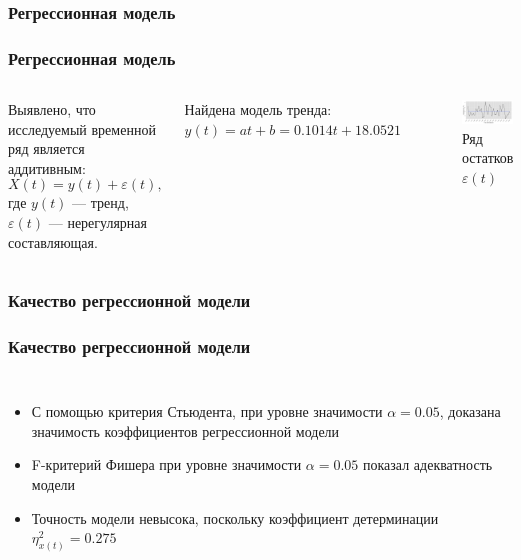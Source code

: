 \documentclass[10pt,pdf,aspectratio=169,hyperref={unicode}]{beamer}
\begin{document}
\subsubsection{Регрессионная модель}
\begin{frame}
  \frametitle{Регрессионная модель}
  \begin{columns}[c]
  \column{2in}
  Выявлено, что исследуемый временной ряд является аддитивным:
  \begin{equation}
    X(t) = y(t) + \varepsilon(t),
  \end{equation}
  где $ y(t) $ --- тренд, $ \varepsilon(t) $ --- нерегулярная составляющая.

  \vspace{0.5em}

  Найдена модель тренда: $ y(t) = at + b = 0.1014t + 18.0521 $
  \column{4in}
    \begin{figure}[h]
    \includegraphics[width=1\linewidth]{../../figures/residual/time-series.png}
    \caption{Ряд остатков $ \varepsilon(t) $}
  \end{figure}
  \end{columns}
\end{frame}

\subsubsection{Качество регрессионной модели}
\begin{frame}
  \frametitle{Качество регрессионной модели}
  \begin{columns}[c]
  \column{3in}
    \begin{itemize}
      \item С помощью критерия Стьюдента, при уровне значимости $ \alpha=0.05 $, доказана значимость коэффициентов регрессионной модели
      \item F-критерий Фишера при уровне значимости $ \alpha = 0.05 $ показал адекватность модели
      \item Точность модели невысока, поскольку коэффициент детерминации $ \eta^2_{x(t)} = 0.275 $
    \end{itemize}
  \column{3in}
    
  \end{columns}
\end{frame}
\end{document}
